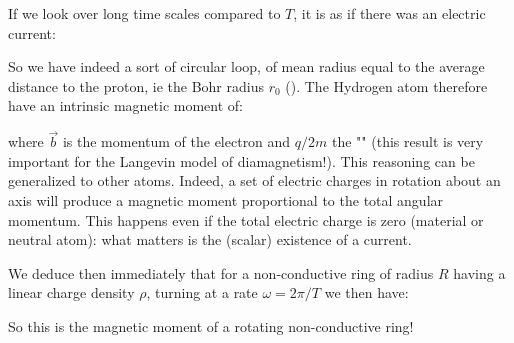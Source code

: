 	If we look over long time scales compared to $T$, it is as if there was an electric current:
	
	So we have indeed a sort of circular loop, of mean radius equal to the average distance to the proton, ie the Bohr radius $r_0$ (). The Hydrogen atom therefore have an intrinsic magnetic moment of:
	
	where $\vec{b}$ is the momentum of the electron and $q / 2m$ the "" (this result is very important for the Langevin model of diamagnetism!). This reasoning can be generalized to other atoms. Indeed, a set of electric charges in rotation about an axis will produce a magnetic moment proportional to the total angular momentum. This happens even if the total electric charge is zero (material or neutral atom): what matters is the (scalar) existence of a current.

	\begin{tcolorbox}[title=Remark,colframe=black,arc=10pt]
	We deduce then immediately that for a non-conductive ring of radius $R$ having a linear charge density $\rho$, turning at a rate $\omega=2\pi/T$ we then have:
	 
	So this is the magnetic moment of a rotating non-conductive ring!
	\end{tcolorbox}	
	
